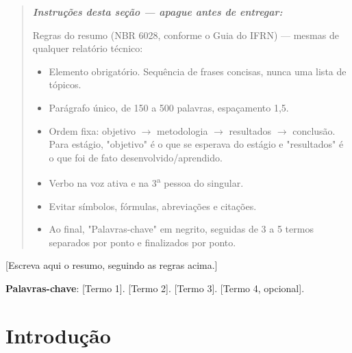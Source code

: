 \documentclass[article,12pt,a4paper]{abntex2}
\newenvironment{instrucoes}{%
  \begin{quotation}\footnotesize\itshape
  \noindent\textbf{\upshape Instruções desta seção — apague antes de entregar:}\par\smallskip
}{%
  \end{quotation}
}
\begin{document}
\maketitle

\begin{resumo}
\begin{instrucoes}
Regras do resumo (NBR 6028, conforme o Guia do IFRN) — mesmas de qualquer relatório técnico:
\begin{itemize}
  \item Elemento obrigatório. Sequência de frases concisas, nunca uma lista de tópicos.
  \item Parágrafo único, de 150 a 500 palavras, espaçamento 1,5.
  \item Ordem fixa: objetivo $\to$ metodologia $\to$ resultados $\to$ conclusão. Para estágio, "objetivo" é o que se esperava do estágio e "resultados" é o que foi de fato desenvolvido/aprendido.
  \item Verbo na voz ativa e na 3\textsuperscript{a} pessoa do singular.
  \item Evitar símbolos, fórmulas, abreviações e citações.
  \item Ao final, "Palavras-chave" em negrito, seguidas de 3 a 5 termos separados por ponto e finalizados por ponto.
\end{itemize}
\end{instrucoes}

[Escreva aqui o resumo, seguindo as regras acima.]

\vspace{\onelineskip}
\noindent
\textbf{Palavras-chave}: [Termo 1]. [Termo 2]. [Termo 3]. [Termo 4, opcional].
\end{resumo}

\textual

\section{Introdução}
\end{document}
